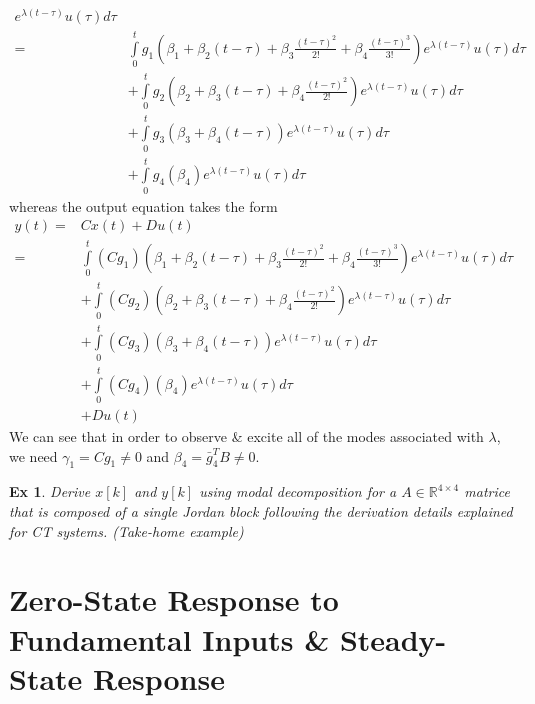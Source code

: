 \documentclass[twoside]{article}
\newtheorem{exmp}[theorem]{Ex}
\begin{document}
\begin{align*}
e^{\lambda (t - \tau)} u(\tau) d \tau 
\\
=& \int\limits_{0}^{t} g_1 \left( \beta_1 + \beta_2 (t-\tau) +  \beta_3 \frac{(t-\tau)^2}{2 !} + \beta_4 \frac{(t-\tau)^3}{3 !} \right)  e^{\lambda (t - \tau)} u(\tau) d \tau 
\\
&+ \int\limits_{0}^{t} g_2 \left( \beta_2 + \beta_3 (t-\tau) +  \beta_4 \frac{(t-\tau)^2}{2 !}  \right)  e^{\lambda (t - \tau)} u(\tau) d \tau 
\\
&+ \int\limits_{0}^{t} g_3 \left( \beta_3 + \beta_4 (t-\tau) \right)  e^{\lambda (t - \tau)} u(\tau) d \tau 
\\
&+ \int\limits_{0}^{t} g_4 \left( \beta_4 \right)  e^{\lambda (t - \tau)} u(\tau) d \tau 
\end{align*}
whereas the output equation takes the form
%
\begin{align*}
	y(t) =& C x(t) + D u(t) 
	\\
	=& \int\limits_{0}^{t} (C g_1) \left( \beta_1 + \beta_2 (t-\tau) +  \beta_3 \frac{(t-\tau)^2}{2 !} + \beta_4 \frac{(t-\tau)^3}{3 !} \right)  e^{\lambda (t - \tau)} u(\tau) d \tau 
\\
&+ \int\limits_{0}^{t} (C g_2) \left( \beta_2 + \beta_3 (t-\tau) +  \beta_4 \frac{(t-\tau)^2}{2 !}  \right)  e^{\lambda (t - \tau)} u(\tau) d \tau 
\\
&+ \int\limits_{0}^{t} (C g_3) \left( \beta_3 + \beta_4 (t-\tau) \right)  e^{\lambda (t - \tau)} u(\tau) d \tau 
\\
&+ \int\limits_{0}^{t} (C g_4) \left( \beta_4 \right)  e^{\lambda (t - \tau)} u(\tau) d \tau 
\\
&+ D u(t)
\end{align*}
%
We can see that in order to observe \& excite all of the modes associated with $\lambda$, we need $\gamma_1 = C g_1 \neq 0$ and $\beta_4 = \bar{g}_4^T B \neq 0$.

\begin{exmp}
	Derive $x[k]$ and $y[k]$ using modal decomposition for a $A \in \mathbb{R}^{4 \times 4}$ matrice that is composed of a single Jordan block
         following the derivation details explained for CT systems. (Take-home example)
\end{exmp}

\section{Zero-State Response to Fundamental Inputs \& Steady-State Response}
\end{document}
